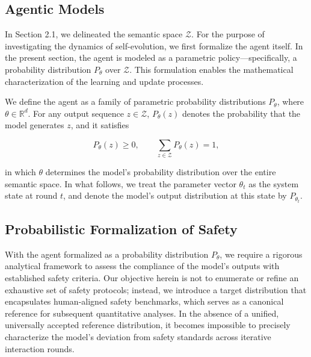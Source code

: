 \subsection{Agentic Models}\label{sec:2-2-agent-model}

In Section 2.1, we delineated the semantic space $\mathcal{Z}$. For the purpose of investigating the dynamics of self-evolution, we first formalize the agent itself. In the present section, the agent is modeled as a parametric policy—specifically, a probability distribution $P_\theta$ over $\mathcal{Z}$. This formulation enables the mathematical characterization of the learning and update processes.


\begin{definition}\label{def:2-2-parametric-policy}

We define the agent as a family of parametric probability distributions $P_\theta$, where $\theta\in\mathbb{R}^d$. For any output sequence $z\in\mathcal{Z}$, $P_\theta(z)$ denotes the probability that the model generates $z$, and it satisfies

\[
P_\theta(z)\ge 0,\qquad \sum_{z\in\mathcal{Z}} P_\theta(z)=1,
\]

in which $\theta$ determines the model's probability distribution over the entire semantic space. In what follows, we treat the parameter vector $\theta_t$  as the system state at round $t$, and denote the model’s output distribution at this state by $P_{\theta_t}$.
\end{definition}

\subsection{Probabilistic Formalization of Safety}\label{sec:2-3-probabilistic-formalization-of-safety}

With the agent formalized as a probability distribution $P_\theta$, we require a rigorous analytical framework to assess the compliance of the model's outputs with established safety criteria. 
Our objective herein is not to enumerate or refine an exhaustive set of safety protocols; instead, we introduce a target distribution that encapsulates human-aligned safety benchmarks, which serves as a canonical reference for subsequent quantitative analyses. 
In the absence of a unified, universally accepted reference distribution, it becomes impossible to precisely characterize the model's deviation from safety standards across iterative interaction rounds.

